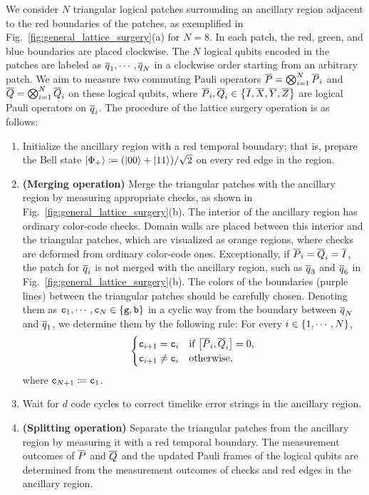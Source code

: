 \documentclass[
 prx,
 reprint,
 superscriptaddress,
 longbibliography,
 dvipsnames
]{revtex4-2}
\begin{document}
We consider $N$ triangular logical patches surrounding an ancillary region adjacent to the red boundaries of the patches, as exemplified in Fig.~\ref{fig:general_lattice_surgery}(a) for $N=8$.
In each patch, the red, green, and blue boundaries are placed clockwise.
The $N$ logical qubits encoded in the patches are labeled as $\overline{q}_{1}, \cdots, \overline{q}_{N}$ in a clockwise order starting from an arbitrary patch.
We aim to measure two commuting Pauli operators $\overline{P} = \bigotimes_{i=1}^N \overline{P}_i$ and $\overline{Q} = \bigotimes_{i=1}^N \overline{Q}_i$ on these logical qubits, where $\overline{P}_i, \overline{Q}_i \in \qty{\overline{I}, \overline{X}, \overline{Y}, \overline{Z}}$ are logical Pauli operators on $\overline{q}_{i}$.
The procedure of the lattice surgery operation is as follows:
\begin{enumerate}
    \item Initialize the ancillary region with a red temporal boundary; that is, prepare the Bell state $\ket{\Phi_+} \coloneqq (\ket{00} + \ket{11})/\sqrt{2}$ on every red edge in the region.
    \item \textbf{(Merging operation)} Merge the triangular patches with the ancillary region by measuring appropriate checks, as shown in Fig.~\ref{fig:general_lattice_surgery}(b).
    The interior of the ancillary region has ordinary color-code checks.
    Domain walls are placed between this interior and the triangular patches, which are visualized as orange regions, where checks are deformed from ordinary color-code ones.
    Exceptionally, if $\overline{P}_i = \overline{Q}_i = \overline{I}$, the patch for $\overline{q}_{i}$ is not merged with the ancillary region, such as $\overline{q}_{3}$ and $\overline{q}_{6}$ in Fig.~\ref{fig:general_lattice_surgery}(b).
    The colors of the boundaries (purple lines) between the triangular patches  should be carefully chosen.
    Denoting them as $\texttt{c}_1, \cdots, \texttt{c}_N \in \qty{\texttt{g}, \texttt{b}}$ in a cyclic way from the boundary between $\overline{q}_{N}$ and $\overline{q}_{1}$, we determine them by the following rule:
    For every $i \in \qty{1, \cdots, N}$,
    \begin{align}
    \begin{split}
        \begin{cases}
            \cbs_{i+1} = \cbs_i & \text{if } \comm{\lgc{P}_i}{\lgc{Q}_i}=0, \\
            \cbs_{i+1} \neq \cbs_i & \text{otherwise},
        \end{cases}
    \end{split}
    \label{eq:rules_determining_boundary_colors}
    \end{align}
    where $\texttt{c}_{N + 1} \coloneqq \texttt{c}_1$.
    \item Wait for $d$ code cycles to correct timelike error strings in the ancillary region.
    \item \textbf{(Splitting operation)} Separate the triangular patches from the ancillary region by measuring it with a red temporal boundary. 
    The measurement outcomes of $\overline{P}$ and $\overline{Q}$ and the updated Pauli frames of the logical qubits are determined from the measurement outcomes of checks and red edges in the ancillary region.
\end{enumerate}
\end{document}
